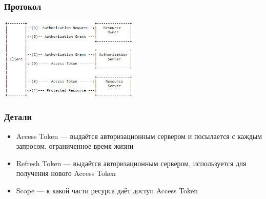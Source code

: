 \documentclass{../cscslides}
\begin{document}
    \begin{frame}
        \frametitle{Протокол}
        \begin{center}
            \includegraphics[width=0.5\textwidth]{oauth.png}
        \end{center}
    \end{frame}

    \begin{frame}
        \frametitle{Детали}
        \begin{itemize}
            \item Access Token --- выдаётся авторизационным сервером и посылается с каждым запросом, ограниченное время жизни
            \item Refresh Token --- выдаётся авторизационным сервером, используется для получения нового Access Token
            \item Scope --- к какой части ресурса даёт доступ Access Token
        \end{itemize}
    \end{frame}
\end{document}

